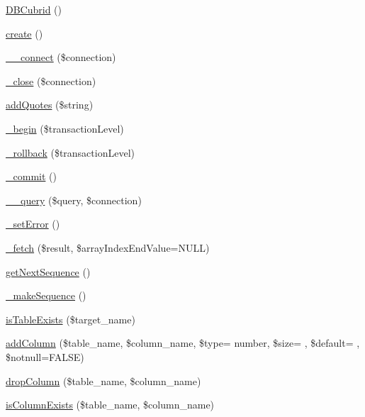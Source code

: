 \begin{DoxyCompactItemize}
\item 
\hyperlink{classDBCubrid_ad17912f5a76c00f761e32178f634581e}{D\+B\+Cubrid} ()
\item 
\hyperlink{classDBCubrid_a9a5f425a0abce46d33a6d713b7dd407f}{create} ()
\item 
\hyperlink{classDBCubrid_aa0798dadf20548b2c38e925f391c72f2}{\+\_\+\+\_\+connect} (\$connection)
\item 
\hyperlink{classDBCubrid_ab1a7b718fc864d7b5992cd99abfe2690}{\+\_\+close} (\$connection)
\item 
\hyperlink{classDBCubrid_ab9aea745152a86b3852101aa3225f26d}{add\+Quotes} (\$string)
\item 
\hyperlink{classDBCubrid_a9d1c4b0ff2003c9e1ef843fbb238616d}{\+\_\+begin} (\$transaction\+Level)
\item 
\hyperlink{classDBCubrid_affb82895449542c9375e12cc0558a2cd}{\+\_\+rollback} (\$transaction\+Level)
\item 
\hyperlink{classDBCubrid_ac8cce69fb6939b2383eb03214ff2522b}{\+\_\+commit} ()
\item 
\hyperlink{classDBCubrid_a2319e8c887147d9596e096088ff67c6a}{\+\_\+\+\_\+query} (\$query, \$connection)
\item 
\hyperlink{classDBCubrid_aaf7dd65f4cdfea9903ab641163058936}{\+\_\+set\+Error} ()
\item 
\hyperlink{classDBCubrid_abb95044521be20a8b2ba105ab623b4d9}{\+\_\+fetch} (\$result, \$array\+Index\+End\+Value=N\+U\+L\+L)
\item 
\hyperlink{classDBCubrid_a56780e480de62dfca8d67c7bccb4791c}{get\+Next\+Sequence} ()
\item 
\hyperlink{classDBCubrid_ac91bfc1859aaeb1a8d7a58e56829d4de}{\+\_\+make\+Sequence} ()
\item 
\hyperlink{classDBCubrid_aa88914b97476deb6c292a44bff2f2f40}{is\+Table\+Exists} (\$target\+\_\+name)
\item 
\hyperlink{classDBCubrid_ab06037303de4dd1eee7ca846e8abdc7d}{add\+Column} (\$table\+\_\+name, \$column\+\_\+name, \$type= \textquotesingle{}number\textquotesingle{}, \$size= \textquotesingle{}\textquotesingle{}, \$default= \textquotesingle{}\textquotesingle{}, \$notnull=F\+A\+L\+S\+E)
\item 
\hyperlink{classDBCubrid_ad0b269d73617c6de8b3135ee36ae43d2}{drop\+Column} (\$table\+\_\+name, \$column\+\_\+name)
\item 
\hyperlink{classDBCubrid_a76c8d9dd51a3e64f18b8d1f4da318ac7}{is\+Column\+Exists} (\$table\+\_\+name, \$column\+\_\+name)

\end{DoxyCompactItemize}
